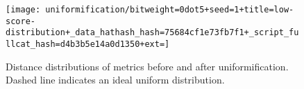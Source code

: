 \begin{figure}
\begin{center}

\texttt{[image: uniformification/bitweight=0dot5+seed=1+title=low-score-distribution+\_data\_hathash\_hash=75684cf1e73fb7f1+\_script\_fullcat\_hash=d4b3b5e14a0d1350+ext=]}
\caption{
Distance distributions of metrics before and after uniformification.
Dashed line indicates an ideal uniform distribution.
}
\label{fig:uniformification}

\end{center}
\end{figure}
